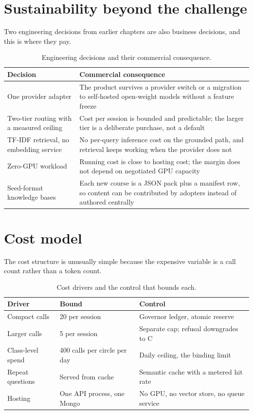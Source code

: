 \section{Sustainability beyond the challenge}

Two engineering decisions from earlier chapters are also business decisions, and this is
where they pay.

\begin{table}[htbp]
\centering
\caption{Engineering decisions and their commercial consequence.}
\label{tab:sustain}
\footnotesize
\begin{tabularx}{\textwidth}{@{}p{4.0cm}X@{}}
\toprule
\textbf{Decision} & \textbf{Commercial consequence} \\
\midrule
One provider adapter & The product survives a provider switch or a migration to
  self-hosted open-weight models without a feature freeze \\
Two-tier routing with a measured ceiling & Cost per session is bounded and predictable;
  the larger tier is a deliberate purchase, not a default \\
TF-IDF retrieval, no embedding service & No per-query inference cost on the grounded path,
  and retrieval keeps working when the provider does not \\
Zero-GPU workload & Running cost is close to hosting cost; the margin does not depend on
  negotiated GPU capacity \\
Seed-format knowledge bases & Each new course is a JSON pack plus a manifest row, so
  content can be contributed by adopters instead of authored centrally \\
\bottomrule
\end{tabularx}
\end{table}

\section{Cost model}

The cost structure is unusually simple because the expensive variable is a call count rather
than a token count.

\begin{table}[htbp]
\centering
\caption{Cost drivers and the control that bounds each.}
\label{tab:cost}
\footnotesize
\begin{tabularx}{\textwidth}{@{}p{3.3cm}p{3.4cm}X@{}}
\toprule
\textbf{Driver} & \textbf{Bound} & \textbf{Control} \\
\midrule
Compact calls & 20 per session & Governor ledger, atomic reserve \\
Larger calls & 5 per session & Separate cap; refusal downgrades to C \\
Class-level spend & 400 calls per circle per day & Daily ceiling, the binding limit \\
Repeat questions & Served from cache & Semantic cache with a metered hit rate \\
Hosting & One API process, one Mongo & No GPU, no vector store, no queue service \\
\bottomrule
\end{tabularx}
\end{table}

